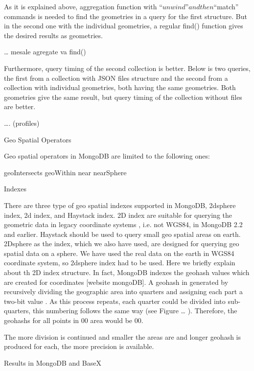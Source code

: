 \documentclass[a4paper,12pt]{article}
\begin{document}
As it is explained above, aggregation function with “$unwind” and then “$match” commands is needed to find the geometries in a query for the first structure. But in the second one with the individual geometries, a regular find() function gives the desired results as geometries.

… mesale agregate va find()

Furthermore, query timing of the second collection is better. Below is two queries, the first from a collection with JSON files structure and the second from a collection with individual geometries, both having the same geometries. Both geometries give the same result, but query timing of the collection without files are better. 

…. (profiles)


Geo Spatial Operators

Geo spatial operators in MongoDB are limited to the following ones:

geoIntersects
geoWithin
near
nearSphere


Indexes 

There are three type of geo spatial indexes supported in MongoDB, 2dsphere index, 2d index, and Haystack index. 2D index are suitable for querying the geometric data in legacy coordinate systems , i.e. not WGS84, in MongoDB 2.2 and earlier. Haystack should be used to query small geo spatial areas on earth. 2Dsphere as the index, which we also have used, are designed for querying geo spatial data on a sphere. We have used the real data on the earth in WGS84 coordinate system, so 2dsphere index had to be used. Here we briefly explain about th 2D index structure. 
In fact, MongoDB indexes the geohash values which are created for coordinates [website mongoDB]. A geohash in generated by recursively dividing the geographic area into quarters and assigning each part a two-bit value . As this process repeats, each quarter could be divided into sub-quarters, this numbering follows the same way (see Figure … ). Therefore, the geohashs for all points in 00 area would be 00.


The more division is continued and smaller the areas are and longer geohash is produced for each, the more precision is available.

Results in MongoDB and BaseX
\end{document}
